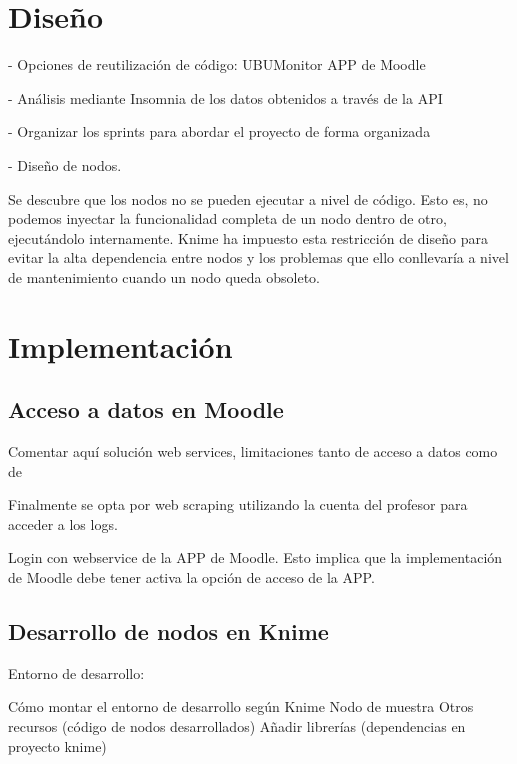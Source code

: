 \section{Diseño}

- Opciones de reutilización de código: 
   UBUMonitor
   APP de Moodle 


- Análisis mediante Insomnia de los datos obtenidos a través de la API

- Organizar los sprints para abordar el proyecto de forma organizada



- Diseño de nodos. 

Se descubre que los nodos no se pueden ejecutar a nivel de código. Esto es, no podemos inyectar la funcionalidad completa de un nodo 
dentro de otro, ejecutándolo internamente. Knime ha impuesto esta restricción de diseño para evitar la alta dependencia entre nodos 
y los problemas que ello conllevaría a nivel de mantenimiento cuando un nodo queda obsoleto. 






\section{Implementación}



\subsection{Acceso a datos en Moodle}


Comentar aquí solución web services, limitaciones tanto de acceso a datos como de 

Finalmente se opta por web scraping utilizando la cuenta del profesor para acceder a los logs. 

Login con webservice de la APP de Moodle. Esto implica que la implementación de Moodle debe tener activa la opción de acceso de la APP. 



\subsection{Desarrollo de nodos en Knime}

Entorno de desarrollo:

Cómo montar el entorno de desarrollo según Knime
Nodo de muestra
Otros recursos (código de nodos desarrollados)
Añadir librerías (dependencias en proyecto knime)






